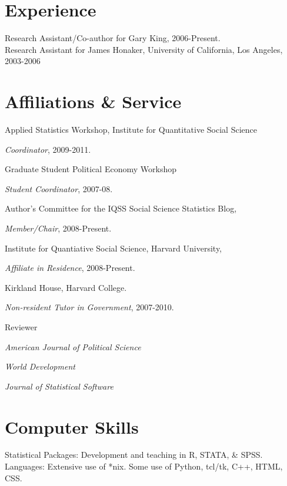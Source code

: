 \documentclass[margin,line]{res}
\newenvironment{list1}{
  \begin{list}{\ding{113}}{%
      \setlength{\itemsep}{0in}
      \setlength{\parsep}{0in} \setlength{\parskip}{0in}
      \setlength{\topsep}{0in} \setlength{\partopsep}{0in} 
      \setlength{\leftmargin}{0.83 cm}}}{\end{list}}
\begin{document}
\begin{resume}
\section{\sc Experience}
Research Assistant/Co-author for Gary King, 2006-Present.\\
Research Assistant for James Honaker, University of California, Los Angeles, 2003-2006

\section{\sc Affiliations \& Service}

Applied Statistics Workshop, Institute for Quantitative
Social Science 
\begin{list1}
\item[] \emph{Coordinator}, 2009-2011.
\end{list1}
\vspace{-1em}
Graduate Student Political Economy Workshop
\begin{list1} 
\item[] \emph{Student Coordinator}, 2007-08.
\end{list1} \vspace{-1em}
Author's Committee for the IQSS Social Science Statistics Blog,
\begin{list1}
\item[]\emph{Member/Chair}, 2008-Present.
\end{list1} \vspace{-1em}
Institute for Quantiative Social Science, Harvard University,
\begin{list1}
\item[] \emph{Affiliate in Residence}, 2008-Present.
\end{list1} \vspace{-1em}
 Kirkland House, Harvard College. 
\begin{list1}
\item[] \emph{Non-resident Tutor in Government}, 2007-2010.
\end{list1} \vspace{-1em}
Reviewer
\begin{list1}
\item[] \emph{American Journal of Political Science}
\item[] \emph{World Development}
\item[] \emph{Journal of Statistical Software}
\end{list1}

\section{\sc Computer Skills} 
Statistical Packages:  Development and teaching in R, STATA, \& SPSS.\\
Languages: Extensive use of *nix. Some use of Python, tcl/tk, C++, HTML, CSS.


\end{resume}
\end{document}
